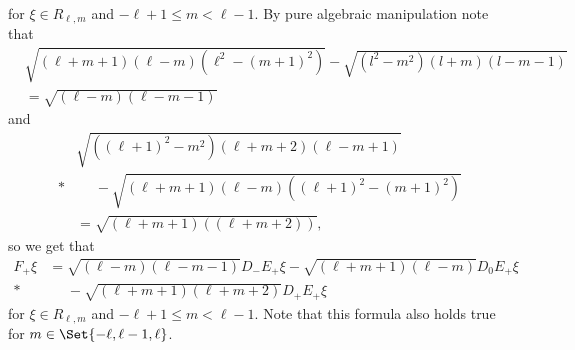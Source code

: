 for $\xi\in R_{\ell,m}$ and $-\ell+1 \leq m < \ell-1$.  By pure algebraic manipulation note that 
\begin{align*}
  &\sqrt{(\ell+m+1)(\ell-m)(\ell^2-(m+1)^2)} - \sqrt{(l^2-m^2)(l+m)(l-m-1)} \\
  &= \sqrt{(\ell-m)(\ell-m-1)}
\end{align*}
and
\begin{align*}
  &\sqrt{((\ell+1)^2-m^2)(\ell+m+2)(\ell-m+1)} \\*
  &\phantom{{}={}}{} - \sqrt{(\ell+m+1)(\ell-m)((\ell+1)^2-(m+1)^2)} \\
  &= \sqrt{(\ell+m+1)((\ell+m+2))},
\end{align*}
so we get that
\begin{align*}
  F_+ \xi &= \sqrt{(\ell-m)(\ell-m-1)} D_-E_+ \xi - \sqrt{(\ell+m+1)(\ell-m)} D_0E_+\xi \\*
  &\phantom{{}={}}{} - \sqrt{(\ell+m+1)(\ell+m+2)} D_+E_+\xi
\end{align*}
for $\xi\in R_{\ell,m}$ and $-\ell+1 \leq m < \ell-1$. Note that this formula also holds true for $m\in\Set{-\ell,\ell-1,\ell}$. 

